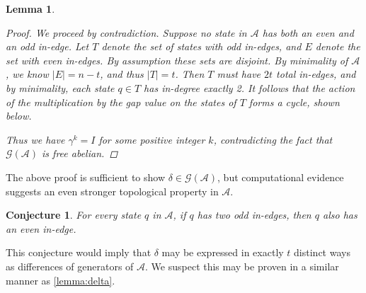 \documentclass[12pt, letterpaper]{article}
\newcommand{\A}{\mathcal A}
\newcommand{\gp}{\mathcal G}
\newtheorem{lemma}[thm]{Lemma}
\newtheorem{conj}[thm]{Conjecture}
\begin{document}
\begin{lemma}
\begin{proof}
        We proceed by contradiction. Suppose no state in $\A$ has both an even
        and an odd in-edge. Let $T$ denote the set of states with odd in-edges,
        and $E$ denote the set with even in-edges. By assumption these sets are
        disjoint. By minimality of $\A$, we know $|E| = n - t$, and thus $|T| =
        t$. Then $T$ must have $2t$ total in-edges, and by minimality, each
        state $q \in T$ has in-degree exactly 2. It follows that the action of
        the multiplication by the gap value on the states of $T$ forms a cycle,
        shown below.
        \begin{center}
        \end{center}
        Thus we have $\gamma^k = I$ for some positive integer $k$, contradicting
        the fact that $\gp(\A)$ is free abelian.
    \end{proof}
\end{lemma}

The above proof is sufficient to show $\delta \in \gp(\A)$, but computational
evidence suggests an even stronger topological property in $\A$.
\begin{conj}\label{conj:no-two-toggle}
    For every state $q$ in $\A$, if $q$ has two odd in-edges, then $q$ also
    has an even in-edge.
\end{conj}
This conjecture would imply that $\delta$ may be expressed in exactly $t$
distinct ways as differences of generators of $\A$. We suspect this may
be proven in a similar manner as \cref{lemma:delta}.
\end{document}
